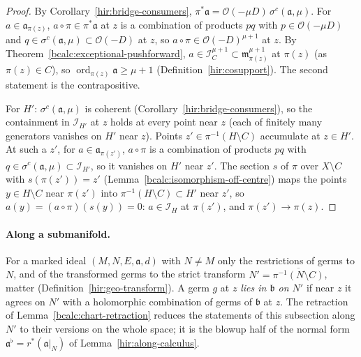 \begin{proof}
\mixedleanok
By Corollary~\ref{hir:bridge-consumers}, \(\pi^*\mathfrak a=\mathcal O(-\mu D)\,\sigma^c(\mathfrak a,\mu)\). For \(a\in\mathfrak a_{\pi(z)}\), \(a\circ\pi\in\pi^*\mathfrak a\) at \(z\) is a
combination of products \(pq\) with \(p\in\mathcal O(-\mu D)\) and \(q\in\sigma^c(\mathfrak a,\mu)\subset\mathcal O(-D)\) at \(z\), so \(a\circ\pi\in\mathcal O(-D)^{\mu+1}\) at
\(z\). By Theorem~\ref{bcalc:exceptional-pushforward}, \(a\in\mathcal I_C^{\mu+1}\subset\mathfrak m_{\pi(z)}^{\mu+1}\) at \(\pi(z)\) (as \(\pi(z)\in C\)), so
\(\operatorname{ord}_{\pi(z)}\mathfrak a\ge\mu+1\) (Definition~\ref{hir:cosupport}). The second statement is the contrapositive.

For \(H'\): \(\sigma^c(\mathfrak a,\mu)\) is coherent (Corollary~\ref{hir:bridge-consumers}), so the containment in \(\mathcal I_{H'}\) at \(z\) holds at every
point near \(z\) (each of finitely many generators vanishes on \(H'\) near \(z\)). Points \(z'\in\pi^{-1}(H\setminus C)\) accumulate at \(z\in H'\). At such a
\(z'\), for \(a\in\mathfrak a_{\pi(z')}\), \(a\circ\pi\) is a combination of products \(pq\) with \(q\in\sigma^c(\mathfrak a,\mu)\subset\mathcal I_{H'}\), so it vanishes on
\(H'\) near \(z'\). The section \(s\) of \(\pi\) over \(X\setminus C\) with \(s(\pi(z'))=z'\) (Lemma~\ref{bcalc:isomorphism-off-centre}) maps the points
\(y\in H\setminus C\) near \(\pi(z')\) into \(\pi^{-1}(H\setminus C)\subset H'\) near \(z'\), so \(a(y)=(a\circ\pi)(s(y))=0\): \(a\in\mathcal I_H\) at \(\pi(z')\), and
\(\pi(z')\to\pi(z)\).
\end{proof}

\paragraph{Along a submanifold.} For a marked ideal \((M,N,E,\mathfrak a,d)\) with \(N\ne M\) only the restrictions of germs to \(N\), and of the
transformed germs to the strict transform \(N'=\overline{\pi^{-1}(N\setminus C)}\), matter (Definition~\ref{hir:geo-transform}). A germ \(g\) at \(z\)
\emph{lies in \(\mathfrak b\) on \(N'\)} if near \(z\) it agrees on \(N'\) with a holomorphic combination of germs of \(\mathfrak b\) at \(z\). The
retraction of Lemma~\ref{bcalc:chart-retraction} reduces the statements of this subsection along \(N'\) to their versions on the whole space; it is the
blowup half of the normal form \(\mathfrak a^\flat=r^*(\mathfrak a|_N)\) of Lemma~\ref{hir:along-calculus}.

